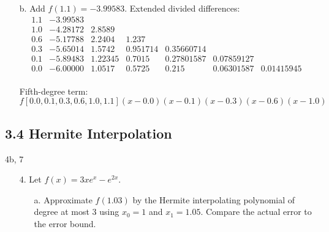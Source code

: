 \begin{enumerate}
\begin{enumerate}
        \medskip

      \item[b.] Add \( f(1.1) = -3.99583 \). Extended divided differences:
        \[
          \begin{array}{c|cccccc}
            1.1 & -3.99583 & & & & & \\
            1.0 & -4.28172 & 2.8589 & & & & \\
            0.6 & -5.17788 & 2.2404 & 1.237 & & & \\
            0.3 & -5.65014 & 1.5742 & 0.951714 & 0.35660714 & & \\
            0.1 & -5.89483 & 1.22345 & 0.7015 & 0.27801587 & 0.07859127 & \\
            0.0 & -6.00000 & 1.0517 & 0.5725 & 0.215 & 0.06301587 &
            0.01415945 \\
          \end{array}
        \]

        Fifth-degree term:
        \[
          f[0.0,0.1,0.3,0.6,1.0,1.1](x-0.0)(x-0.1)(x-0.3)(x-0.6)(x-1.0)
        \]

    \end{enumerate}

    \subsection*{3.4 Hermite Interpolation}

    4b, 7

    \begin{enumerate}
      \item[4.] Let \( f(x) = 3xe^x - e^{2x} \).
        \begin{enumerate}
          \item[a.]  Approximate \(f(1.03)\) by the Hermite
            interpolating polynomial of degree at most 3 using \(x_0
            = 1\) and \(x_1 = 1.05\). Compare the actual error to the
            error bound.


\end{enumerate}
\end{enumerate}
\end{enumerate}

